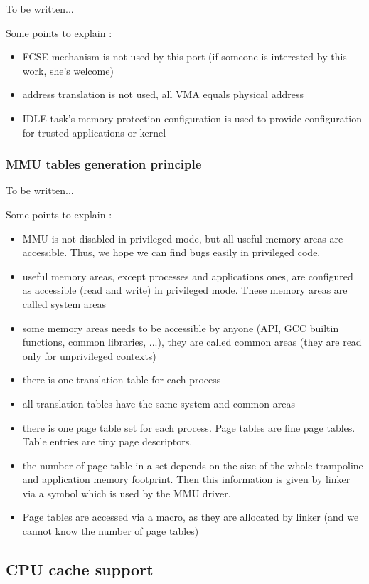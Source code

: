 To be written...

Some points to explain :
\begin{itemize}
\item FCSE mechanism is not used by this port (if someone is interested by this work, she's welcome)
\item address translation is not used, all VMA equals physical address
\item IDLE task's memory protection configuration is used to provide configuration for trusted applications or kernel
\end{itemize}

\subsubsection{MMU tables generation principle}

To be written...

Some points to explain :
\begin{itemize}
\item MMU is not disabled in privileged mode, but all useful memory areas are accessible. Thus, we hope we can find bugs easily in privileged code.
\item useful memory areas, except processes and applications ones, are configured as accessible (read and write) in privileged mode. These memory areas are called system areas
\item some memory areas needs to be accessible by anyone (API, GCC builtin functions, common libraries, ...), they are called common areas (they are read only for unprivileged contexts)
\item there is one translation table for each process
\item all translation tables have the same system and common areas
\item there is one page table set for each process. Page tables are fine page tables. Table entries are tiny page descriptors.
\item the number of page table in a set depends on the size of the whole trampoline and application memory footprint. Then this information is given by linker via a symbol which is used by the MMU driver.
\item Page tables are accessed via a macro, as they are allocated by linker (and we cannot know the number of page tables)
\end{itemize}

\subsection{CPU cache support}

